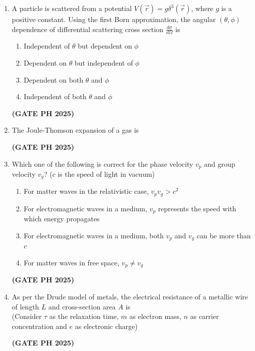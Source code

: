 \documentclass[14pt, a4paper]{extarticle}
\renewcommand{\vec}[1]{\overrightarrow{#1}}
\begin{document}
\begin{enumerate}[label=\textbf{Q.\arabic*}]
\item A particle is scattered from a potential $V(\vec{r}) = g\delta^3(\vec{r})$, where $g$ is a positive constant. Using the first Born approximation, the angular $(\theta, \phi)$ dependence of differential scattering cross section $\frac{d\sigma}{d\Omega}$ is
\begin{enumerate}
\item Independent of $\theta$ but dependent on $\phi$
\item Dependent on $\theta$ but independent of $\phi$
\item Dependent on both $\theta$ and $\phi$
\item Independent of both $\theta$ and $\phi$
\end{enumerate}
\hfill \textbf{(GATE PH 2025)}

\item The Joule-Thomson expansion of a gas is
\begin{enumerate}
\end{enumerate}
\hfill \textbf{(GATE PH 2025)}

\item Which one of the following is correct for the phase velocity $v_p$ and group velocity $v_g$? ($c$ is the speed of light in vacuum)
\begin{enumerate}
\item For matter waves in the relativistic case, $v_p v_g > c^2$
\item For electromagnetic waves in a medium, $v_p$ represents the speed with which energy propagates
\item For electromagnetic waves in a medium, both $v_p$ and $v_g$ can be more than $c$
\item For matter waves in free space, $v_p \neq v_g$
\end{enumerate}
\hfill \textbf{(GATE PH 2025)}

\item As per the Drude model of metals, the electrical resistance of a metallic wire of length $L$ and cross-section area $A$ is \\
(Consider $\tau$ as the relaxation time, $m$ as electron mass, $n$ as carrier concentration and $e$ as electronic charge)
\begin{enumerate}
\end{enumerate}
\hfill \textbf{(GATE PH 2025)}


\end{enumerate}
\end{document}
